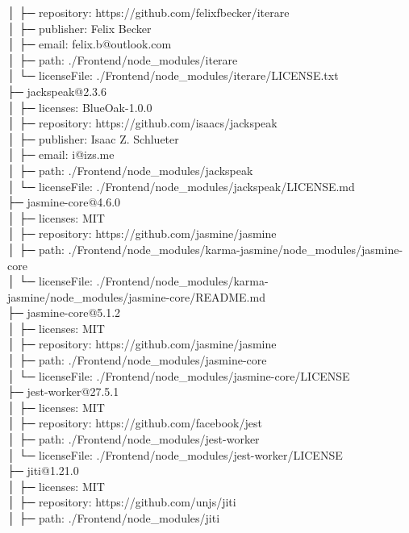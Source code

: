 │  ├─ repository: https://github.com/felixfbecker/iterare\\
│  ├─ publisher: Felix Becker\\
│  ├─ email: felix.b@outlook.com\\
│  ├─ path: ./Frontend/node\_modules/iterare\\
│  └─ licenseFile: ./Frontend/node\_modules/iterare/LICENSE.txt\\
├─ jackspeak@2.3.6\\
│  ├─ licenses: BlueOak-1.0.0\\
│  ├─ repository: https://github.com/isaacs/jackspeak\\
│  ├─ publisher: Isaac Z. Schlueter\\
│  ├─ email: i@izs.me\\
│  ├─ path: ./Frontend/node\_modules/jackspeak\\
│  └─ licenseFile: ./Frontend/node\_modules/jackspeak/LICENSE.md\\
├─ jasmine-core@4.6.0\\
│  ├─ licenses: MIT\\
│  ├─ repository: https://github.com/jasmine/jasmine\\
│  ├─ path: ./Frontend/node\_modules/karma-jasmine/node\_modules/jasmine-core\\
│  └─ licenseFile: ./Frontend/node\_modules/karma-jasmine/node\_modules/jasmine-core/README.md\\
├─ jasmine-core@5.1.2\\
│  ├─ licenses: MIT\\
│  ├─ repository: https://github.com/jasmine/jasmine\\
│  ├─ path: ./Frontend/node\_modules/jasmine-core\\
│  └─ licenseFile: ./Frontend/node\_modules/jasmine-core/LICENSE\\
├─ jest-worker@27.5.1\\
│  ├─ licenses: MIT\\
│  ├─ repository: https://github.com/facebook/jest\\
│  ├─ path: ./Frontend/node\_modules/jest-worker\\
│  └─ licenseFile: ./Frontend/node\_modules/jest-worker/LICENSE\\
├─ jiti@1.21.0\\
│  ├─ licenses: MIT\\
│  ├─ repository: https://github.com/unjs/jiti\\
│  ├─ path: ./Frontend/node\_modules/jiti\\
